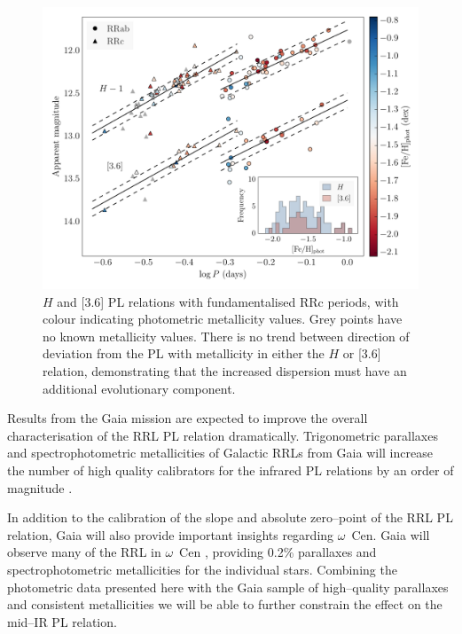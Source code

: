 \documentclass[a4paper,fleqn,usenatbib]{mnras}
\begin{document}
\begin{figure}
\begin{center}
\includegraphics[width=160mm]{reworked_fitting_code/final_plots/phot_color_PL.pdf}
\caption{$H$ and [3.6] PL relations with fundamentalised RRc periods, with colour indicating photometric \citep{2000AJ....119.1824R} metallicity values. Grey points have no known metallicity values. There is no trend between direction of deviation from the PL with metallicity in either the $H$ or [3.6] relation, demonstrating that the increased dispersion must have an additional evolutionary component.}
\label{fig:hband_photo}
\end{center}
\end{figure}


Results from the Gaia mission \citep{1996A&AS..116..579L} are expected to improve the overall characterisation of the RRL PL relation dramatically. Trigonometric parallaxes and spectrophotometric metallicities of Galactic RRLs from Gaia will increase the number of high quality calibrators for the infrared PL relations by an order of magnitude \citep[Scowcroft et al. 2016b, in prep., Beaton et al. 2016, in prep.]{2012MNRAS.426.2463L}. 

In addition to the calibration of the slope and absolute zero--point of the RRL PL relation, Gaia will also provide important insights regarding $\omega$~Cen. Gaia will observe many of the RRL in $\omega$~Cen \citep{2002ASPC..265..415B}, providing 0.2\% parallaxes and spectrophotometric metallicities for the individual stars. Combining the photometric data presented here with the Gaia sample of high--quality parallaxes and consistent metallicities we will be able to further constrain the effect on the mid--IR PL relation.
\end{document}
